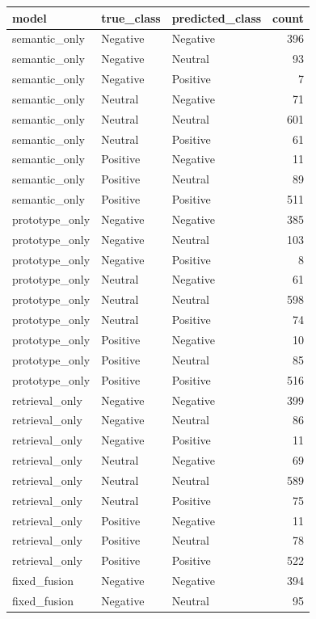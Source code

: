 \begin{tabular}{lllr}
\toprule
model & true_class & predicted_class & count \\
\midrule
semantic_only & Negative & Negative & 396 \\
semantic_only & Negative & Neutral & 93 \\
semantic_only & Negative & Positive & 7 \\
semantic_only & Neutral & Negative & 71 \\
semantic_only & Neutral & Neutral & 601 \\
semantic_only & Neutral & Positive & 61 \\
semantic_only & Positive & Negative & 11 \\
semantic_only & Positive & Neutral & 89 \\
semantic_only & Positive & Positive & 511 \\
prototype_only & Negative & Negative & 385 \\
prototype_only & Negative & Neutral & 103 \\
prototype_only & Negative & Positive & 8 \\
prototype_only & Neutral & Negative & 61 \\
prototype_only & Neutral & Neutral & 598 \\
prototype_only & Neutral & Positive & 74 \\
prototype_only & Positive & Negative & 10 \\
prototype_only & Positive & Neutral & 85 \\
prototype_only & Positive & Positive & 516 \\
retrieval_only & Negative & Negative & 399 \\
retrieval_only & Negative & Neutral & 86 \\
retrieval_only & Negative & Positive & 11 \\
retrieval_only & Neutral & Negative & 69 \\
retrieval_only & Neutral & Neutral & 589 \\
retrieval_only & Neutral & Positive & 75 \\
retrieval_only & Positive & Negative & 11 \\
retrieval_only & Positive & Neutral & 78 \\
retrieval_only & Positive & Positive & 522 \\
fixed_fusion & Negative & Negative & 394 \\
fixed_fusion & Negative & Neutral & 95 \\

\end{tabular}
